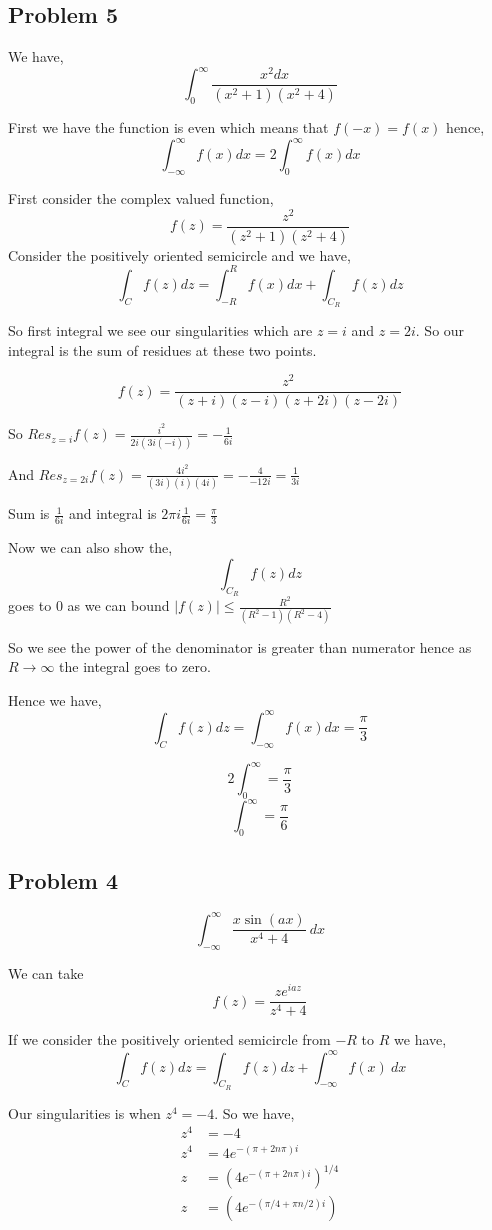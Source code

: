 \documentclass[a4paper]{report}
\begin{document}
\subsection*{Problem 5}
We have, 
$$ \int_0^{\infty} \frac{x^2 dx}{(x^2 + 1)(x^2 + 4)} $$ 

First we have the function is even which means that $f(-x) = f(x)$ hence,  
$$ \int_{-\infty}^{\infty} f(x) dx= 2\int_{0}^{\infty}f(x) dx $$ 

First consider the complex valued function, 
$$ f(z) = \frac{z^2 }{(z^2 + 1)(z^2 + 4)}$$ 
Consider the positively oriented semicircle and we have, 
$$ \int_{C} f(z) dz = \int_{-R}^{R} f(x) dx + \int_{C_R} f(z) dz $$ 


So first integral we see our singularities which are $z = i$ and $z = 2i$. So our integral is  the sum of residues at these two points.

$$ f(z) = \frac{z^2}{(z + i)(z - i)(z + 2i)(z - 2i)} $$ 

So $Res_{z = i} f(z) = \frac{i^2}{2i(3i(-i))} = -\frac{1}{6i}$ 

And $Res_{z = 2i} f(z) = \frac{4i^2}{(3i)(i)(4i)} = -\frac{4}{-12i} = \frac{1}{3i}$ 

Sum is $\frac{1}{6i}$ and integral is $2\pi i \frac{1}{6i} = \frac{\pi}{3}$ 

Now we can also show the, 
$$ \int_{C_R} f(z) dz $$  goes to $0$ as we can bound $|f(z)| \le \frac{R^2}{(R^2 -1)(R^2 - 4)}$ 

So we see the power of the denominator is greater than numerator hence  as $R \rightarrow \infty$ the integral goes to zero.

Hence  we have, 
$$ \int_C f(z) dz = \int_{-\infty}^{\infty} f(x) dx  = \frac{\pi}{3} $$ 

$$ 2 \int_0^{\infty} = \frac{\pi}{3} $$ 
$$ \int_0^{\infty} = \frac{\pi}{6} $$ 
\subsection*{Problem 4}

$$ \int_{{-\infty}}^{{\infty}} {\frac{x \sin (ax)}{x^{4} + 4}} \: d{x} {} $$ 

We can take $$f(z) = \frac{ze^{iaz}}{z^{4} + 4}$$ 

If we consider the positively oriented semicircle from $-R$ to $R$ we have, 
$$ \int_C f(z) dz = \int_{C_R} f(z) dz + \int_{{-\infty}}^{{\infty}} {f(x)} \: d{x} {} $$ 



Our singularities is when $z^{4}= -4$. So we have,  
\begin{align*}
    z^{4} &= -4  \\
    z^{4}&= 4e^{-(\pi + 2n\pi) i}\\
    z&= (4e^{-(\pi + 2n\pi) i})^{1 / 4}\\
    z&= (4e^{-(\pi /4 + \pi n/2) i})\\
\end{align*}
\end{document}
